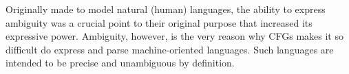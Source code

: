 	\bigskip


	Originally made to model natural (human) languages, the ability to express ambiguity was a crucial point to their original purpose that increased its expressive power. 
	Ambiguity, however, is the very reason why CFGs makes it so difficult do express and parse machine-oriented languages. Such languages are intended to be precise and unambiguous by definition.








